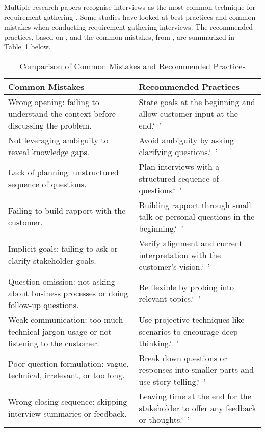 Multiple research papers recognise interviews as the most common technique for requirement gathering \parencite{interviews5,interviews1,interviews2}. Some studies have looked at best practices and common mistakes when conducting requirement gathering interviews. The recommended practices, based on \textcite{interviews4, interviews3}, and the common mistakes, from \textcite{interviews1, interviews2}, are summarized in Table~\ref{tab:comparison_mistakes_practices} below.

\begin{table}[h!]
    \centering
    \small
    \renewcommand{\arraystretch}{1.2}
    \begin{tabular}{|>{\arraybackslash}m{}|>{\arraybackslash}m{}|}
    \hline
    \textbf{Common Mistakes} & \textbf{Recommended Practices} \\ \hline
    Wrong opening: failing to understand the context before discussing the problem. & State goals at the beginning and allow customer input at the end.`\ '\\ \hline
    Not leveraging ambiguity to reveal knowledge gaps. & Avoid ambiguity by asking clarifying questions.`\ '\\ \hline
    Lack of planning: unstructured sequence of questions. & Plan interviews with a structured sequence of questions.`\ '\\ \hline
    Failing to build rapport with the customer. & Building rapport through small talk or personal questions in the beginning.`\ '\\ \hline
    Implicit goals: failing to ask or clarify stakeholder goals. & Verify alignment and current interpretation with the customer's vision.`\ '\\ \hline
    Question omission: not asking about business processes or doing follow-up questions. & Be flexible by probing into relevant topics.`\ '\\ \hline
    Weak communication: too much technical jargon usage or not listening to the customer. & Use projective techniques like scenarios to encourage deep thinking.`\ '\\ \hline
    Poor question formulation: vague, technical, irrelevant, or too long. & Break down questions or responses into smaller parts and use story telling.`\ '\\ \hline
    Wrong closing sequence: skipping interview summaries or feedback. & Leaving time at the end for the stakeholder to offer any feedback or thoughts.`\ '\\ \hline
    \end{tabular}
    \caption{Comparison of Common Mistakes and Recommended Practices}\label{tab:comparison_mistakes_practices}
\end{table}

